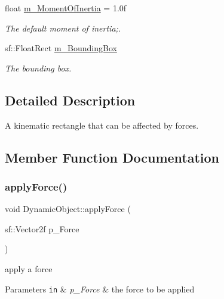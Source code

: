 \begin{DoxyCompactItemize}
\mbox{\label{class_dynamic_object_a860cf85df59fd5d08810d082a43fdab1}} 
float \hyperlink{class_dynamic_object_a860cf85df59fd5d08810d082a43fdab1}{m\+\_\+\+Moment\+Of\+Inertia} = 1.\+0f
\begin{DoxyCompactList}\small\item\em The default moment of inertia;. \end{DoxyCompactList}\item 
\mbox{\label{class_dynamic_object_a7149219cede0b96d7d381b424ae3dd3f}} 
sf\+::\+Float\+Rect \hyperlink{class_dynamic_object_a7149219cede0b96d7d381b424ae3dd3f}{m\+\_\+\+Bounding\+Box}
\begin{DoxyCompactList}\small\item\em The bounding box. \end{DoxyCompactList}\end{DoxyCompactItemize}


\subsection{Detailed Description}
A kinematic rectangle that can be affected by forces. 

\subsection{Member Function Documentation}
\mbox{\label{class_dynamic_object_a33c22fe97d62f79152c508c03ada948c}} 
\subsubsection{\texorpdfstring{apply\+Force()}{applyForce()}}
{\footnotesize\ttfamily void Dynamic\+Object\+::apply\+Force (\begin{DoxyParamCaption}\item[{sf\+::\+Vector2f}]{p\+\_\+\+Force }\end{DoxyParamCaption})}

apply a force 
\begin{DoxyParams}[1]{Parameters}
\mbox{\tt in}  & {\em p\+\_\+\+Force} & the force to be applied \\
\hline
\end{DoxyParams}
\mbox{\label{class_dynamic_object_ae3d4fa8bda00ba66b59ade0e01abbec5}} 
